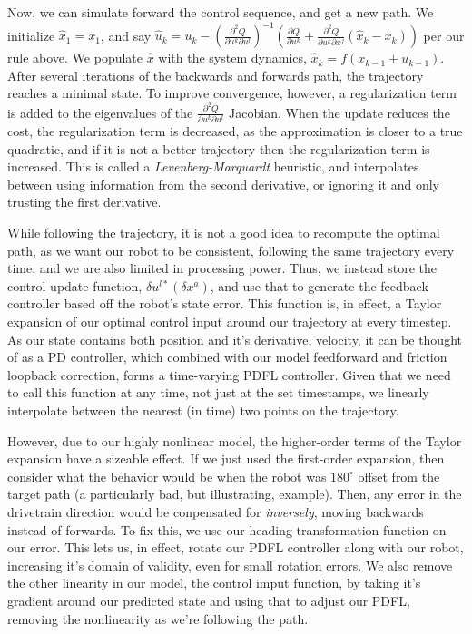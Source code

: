 \documentclass[a4paper,12pt]{article}
\begin{document}
Now, we can simulate forward the control sequence, and get a new path. We initialize $\hat x_1 = x_1$, and say $\hat u_k = u_k -\left (\frac {\partial^2 Q}{\partial u^k \partial u^l} \right)^{-1}\left(\frac {\partial Q}{\partial u^k} + \frac {\partial^2 Q}{\partial u^k \partial x^j} (\hat x_k - x_k)\right)$  per our rule above. We populate $\hat x$ with the system dynamics, $\hat x_k = f(x_{k-1} + u_{k-1})$. After several iterations of the backwards and forwards path, the trajectory reaches a minimal state. To improve convergence, however, a regularization term is added to the eigenvalues of the $\frac{\partial ^2 Q}{\partial u^k \partial u^l}$ Jacobian. When the update reduces the cost, the regularization term is decreased, as the approximation is closer to a true quadratic, and if it is not a better trajectory then the regularization term is increased. This is called a \textit{Levenberg-Marquardt} heuristic, and interpolates between using information from the second derivative, or ignoring it and only trusting the first derivative.

While following the trajectory, it is not a good idea to recompute the optimal path, as we want our robot to be consistent, following the same trajectory every time, and we are also limited in processing power. Thus, we instead store the control update function, $\delta u^{l*}(\delta x^a)$, and use that to generate the feedback controller based off the robot's state error. This function is, in effect, a Taylor expansion of our optimal control input around our trajectory at every timestep. As our state contains both position and it's derivative, velocity, it can be thought of as a PD controller, which combined with our model feedforward and friction loopback correction, forms a time-varying PDFL controller. Given that we need to call this function at any time, not just at the set timestamps, we linearly interpolate between the nearest (in time) two points on the trajectory.

However, due to our highly nonlinear model, the higher-order terms of the Taylor expansion have a sizeable effect. If we just used the first-order expansion, then consider what the behavior would be when the robot was $180 ^\circ$ offset from the target path (a particularly bad, but illustrating, example). Then, any error in the drivetrain direction would be conpensated for \textit{inversely}, moving backwards instead of forwards. To fix this, we use our heading transformation function on our error. This lets us, in effect, rotate our PDFL controller along with our robot, increasing it's domain of validity, even for small rotation errors. We also remove the other linearity in our model, the control imput function, by taking it's gradient around our predicted state and using that to adjust our PDFL, removing the nonlinearity as we're following the path.
\end{document}
